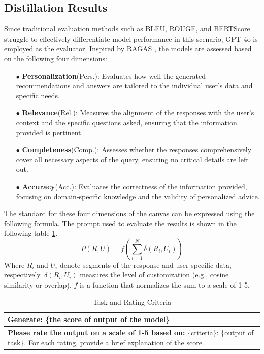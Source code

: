 \documentclass[preprint,12pt]{elsarticle}
\begin{document}
\subsection{Distillation Results}
Since traditional evaluation methods such as BLEU, ROUGE, and BERTScore struggle to effectively differentiate model performance in this scenario, GPT-4o \cite{bavaresco2024LLMs} is employed as the evaluator. Inspired by RAGAS \cite{es2023ragas}, the models are assessed based on the following four dimensions:
\begin{itemize}
    \item [$\bullet$] \textbf{Personalization}(Pers.): Evaluates how well the generated recommendations and answers are tailored to the individual user’s data and specific needs.
\end{itemize}
\begin{itemize}
    \item [$\bullet$] \textbf{Relevance}(Rel.): Measures the alignment of the responses with the user's context and the specific questions asked, ensuring that the information provided is pertinent.
\end{itemize}
\begin{itemize}
    \item [$\bullet$] \textbf{Completeness}(Comp.): Assesses whether the responses comprehensively cover all necessary aspects of the query, ensuring no critical details are left out.
\end{itemize}
\begin{itemize}
    \item [$\bullet$] \textbf{Accuracy}(Acc.): Evaluates the correctness of the information provided, focusing on domain-specific knowledge and the validity of personalized advice.
\end{itemize}

The standard for these four dimensions of the canvas can be expressed using the following formula. The prompt used to evaluate the results is shown in the following table \ref{tab:T}.
\[P(R, U) = f \left( \sum_{i=1}^{N} \delta(R_i, U_i) \right)\]
Where \( R_i \) and \( U_i \) denote segments of the response and user-specific data, respectively. \( \delta(R_i, U_i) \) measures the level of customization (e.g., cosine similarity or overlap). \( f \) is a function that normalizes the sum to a scale of 1-5.
\begin{table}[h]
\centering
\caption{Task and Rating Criteria}
\label{tab:T}
\begin{tabular}{p{}}
\toprule
\textbf{Generate:} 
\{the score of output of the model\} \\ 
\midrule
\textbf{Please rate the output on a scale of 1-5 based on:} 
\{criteria\}: \{output of task\}.
For each rating, provide a brief explanation of the score. \\ 
\bottomrule
\end{tabular}
\end{table}
\end{document}
